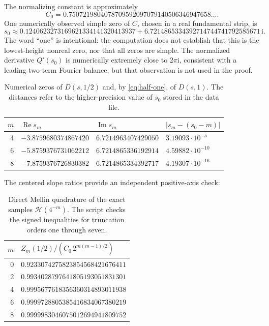 \documentclass[11pt,a4paper]{article}
\numberwithin{equation}{section}
\theoremstyle{definition}
\theoremstyle{remark}
\newcommand{\ii}{\mathrm i}
\newcommand{\Rea}{\operatorname{Re}}
\newcommand{\Ima}{\operatorname{Im}}
\newcommand{\abs}[1]{\left|#1\right|}
\newcommand{\calH}{\mathcal H}
\begin{document}
The normalizing constant is approximately
\begin{equation}
 C_0=0.7507219804078709592097079140506346947658\ldots.
 \label{eq:C0-numeric}
\end{equation}
One numerically observed simple zero of $C$, chosen in a real
fundamental strip, is
\begin{equation}
 s_0\approx
 0.1240623273169621334141320413937
 +6.7214865334392714744741792585671\,\ii.
 \label{eq:s0-numeric}
\end{equation}
The word ``one'' is intentional: the computation does not establish
that this is the lowest-height nonreal zero, nor that all zeros are
simple. The normalized derivative $Q'(s_0)$ is numerically extremely
close to $2\pi\ii$, consistent with a leading two-term Fourier
balance, but that observation is not used in the proof.

\begin{table}[ht]
\centering\small
\begin{tabular}{@{}rlll@{}}
\toprule
$m$&$\Rea s_m$&$\Ima s_m$&$\abs{s_m-(s_0-m)}$\\
\midrule
4&$-3.8759680374867420$&$6.7214963407429050$&$3.19093\cdot10^{-5}$\\
6&$-5.8759376731062212$&$6.7214865336192914$&$4.59882\cdot10^{-10}$\\
8&$-7.8759376726830382$&$6.7214865334392717$&$4.19307\cdot10^{-16}$\\
\bottomrule
\end{tabular}
\caption{Numerical zeros of $D(s,1/2)$ and, by
\cref{eq:half-one}, of $D(s,1)$. The distances refer to the
higher-precision value of $s_0$ stored in the data file.}
\label{tab:zeros}
\end{table}

The centered slope ratios provide an independent positive-axis
check:
\begin{table}[ht]
\centering
\begin{tabular}{@{}rl@{}}
\toprule
$m$&$Z_m(1/2)/(C_0\,2^{m(m-1)/2})$\\
\midrule
0&$0.9233074275823854568421676411$\\
2&$0.9934028797641805193051831301$\\
4&$0.9995677618356360314893011938$\\
6&$0.9999728805385416834067380219$\\
8&$0.9999983046075012694941809752$\\
\bottomrule
\end{tabular}
\caption{Direct Mellin quadrature of the exact samples
$\calH(4^{-m})$. The script checks the signed inequalities for
truncation orders one through seven.}
\label{tab:ratios}
\end{table}
\end{document}
